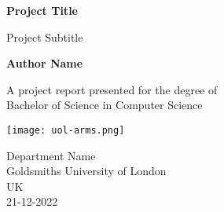 \begin{titlepage}
   \begin{center}
       \vspace*{1cm}

       \Huge
       \textbf{Project Title}

       \vspace{0.5cm}
       \Large
       Project Subtitle
            
       \vspace{1.5cm}

       \textbf{Author Name}

       \vfill
            
       A project report presented for the degree of\\
       Bachelor of Science in Computer Science
            
       \vspace{0.8cm}
     
       \texttt{[image: uol-arms.png]}
            
       \Large
       Department Name\\
       Goldsmiths University of London\\
       UK\\
       21-12-2022
            
   \end{center}
\end{titlepage}
